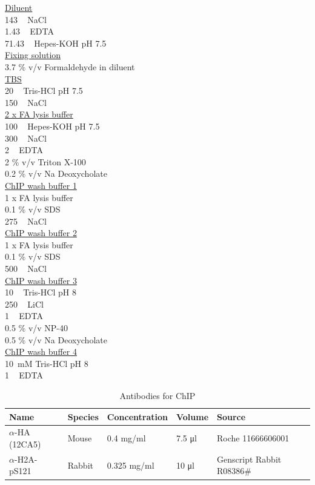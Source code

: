 \underline{Diluent}\\
143 \si{\milli\Molar} NaCl\\
1.43 \si{\milli\Molar} EDTA\\
71.43 \si{\milli\Molar} Hepes-KOH pH 7.5\\

\underline{Fixing solution}\\
3.7 \% v/v Formaldehyde in diluent\\

\underline{TBS}\\
20 \si{\milli\Molar} Tris-HCl pH 7.5\\
150 \si{\milli\Molar} NaCl\\

\underline{2 x FA lysis buffer}\\
100 \si{\milli\Molar} Hepes-KOH pH 7.5\\
300 \si{\milli\Molar} NaCl\\
2 \si{\milli\Molar} EDTA \\
2 \% v/v Triton X-100\\
0.2 \% v/v Na Deoxycholate\\

\underline{ChIP wash buffer 1}\\
1 x FA lysis buffer\\
0.1 \% v/v SDS\\
275 \si{\milli\Molar} NaCl\\

\underline{ChIP wash buffer 2}\\
1 x FA lysis buffer\\
0.1 \% v/v SDS\\
500 \si{\milli\Molar} NaCl\\

\underline{ChIP wash buffer 3}\\
10 \si{\milli\Molar} Tris-HCl pH 8\\
250 \si{\milli\Molar} LiCl\\
1 \si{\milli\Molar} EDTA\\
0.5 \% v/v NP-40\\
0.5 \% v/v Na Deoxycholate\\

\underline{ChIP wash buffer 4}\\
10\si{\milli\Molar}mM Tris-HCl pH 8\\
1 \si{\milli\Molar} EDTA\\

\begin{table}[htbp]
\centering
\caption{Antibodies for ChIP}
\label{tab:abChIP}
\begin{tabular}{lllll}
\hline
\textbf{Name} & \textbf{Species} & \textbf{Concentration} & \textbf{Volume} & \textbf{Source} \\ \hline
$\alpha$-HA (12CA5) & Mouse & 0.4 \si{\milli\gram/\milli\litre} & 7.5 \si{\micro\litre} & Roche 11666606001 \\   
$\alpha$-H2A-pS121 & Rabbit & 0.325 \si{\milli\gram/\milli\litre} & 10 \si{\micro\litre} & Genscript Rabbit R08386\# \\
\end{tabular}
\end{table}

